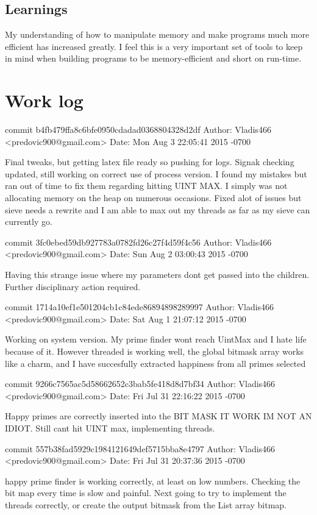 \documentclass[letterpaper,10pt,titlepage]{article}
\begin{document}
\subsection{Learnings}
My understanding of how to manipulate memory and make programs much more efficient has increased greatly.
I feel this is a very important set of tools to keep in mind when building programs to be memory-efficient and short on run-time.

\section{Work log}
commit b4fb479ffa8c6bfe0950cdadad0368804328d2df
Author: Vladis466 <predovic900@gmail.com>
Date:   Mon Aug 3 22:05:41 2015 -0700

    Final tweaks, but getting latex file ready so pushing for logs. Signak checking updated, still working on correct use of process version. 
	I found my mistakes but ran out of time to fix them regarding hitting UINT MAX. I simply was not allocating memory on the heap on numerous occasions. Fixed alot of issues but sieve needs a rewrite and I am able to max out my threads as far as my sieve can currently go.

commit 3fc0ebed59db927783a0782fd26c27f4d59f4c56
Author: Vladis466 <predovic900@gmail.com>
Date:   Sun Aug 2 03:00:43 2015 -0700

    Having this strange issue where my parameters dont get passed into the children. Further disciplinary action required.

commit 1714a10ef1e501204cb1c84ede86894898289997
Author: Vladis466 <predovic900@gmail.com>
Date:   Sat Aug 1 21:07:12 2015 -0700

    Working on system version. My prime finder wont reach UintMax and I hate life because of it. However threaded is working well, the global bitmask array works like a charm,
	and I have succesfully extracted happiness from all primes selected

commit 9266c7565ac5d58662652c3bab5fe418d8d7bf34
Author: Vladis466 <predovic900@gmail.com>
Date:   Fri Jul 31 22:16:22 2015 -0700

    Happy primes are correctly inserted into the BIT MASK IT WORK IM NOT AN IDIOT. Still cant hit UINT max, implementing threads.

commit 557b38fad5929c1984121649def5715bba8e4797
Author: Vladis466 <predovic900@gmail.com>
Date:   Fri Jul 31 20:37:36 2015 -0700

    happy prime finder is working correctly, at least on low numbers. Checking the bit map every time is slow and painful. Next going to try to implement the threads correctly, 
	or create the output bitmask from the List array bitmap.
\end{document}
